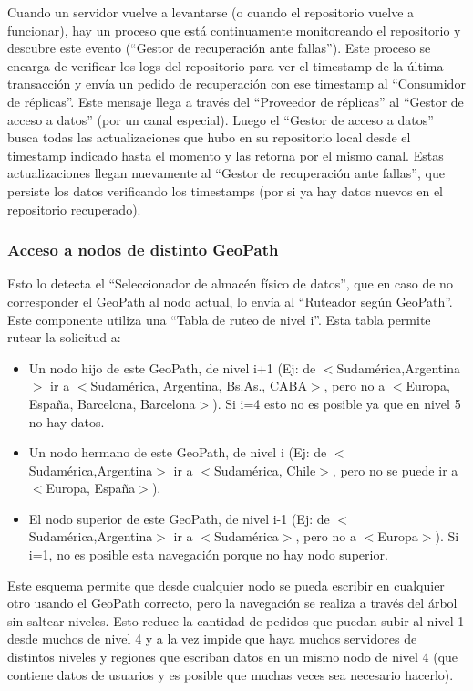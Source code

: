 Cuando un servidor vuelve a levantarse (o cuando el repositorio vuelve a funcionar), hay un proceso que está continuamente monitoreando el repositorio y descubre este evento (“Gestor de recuperación ante fallas”). Este proceso se encarga de verificar los logs del repositorio para ver el timestamp de la última transacción y envía un pedido de recuperación con ese timestamp al “Consumidor de réplicas”. Este mensaje llega a través del “Proveedor de réplicas” al “Gestor de acceso a datos” (por un canal especial). Luego el “Gestor de acceso a datos” busca todas las actualizaciones que hubo en su repositorio local desde el timestamp indicado hasta el momento y las retorna por el mismo canal. Estas actualizaciones llegan nuevamente al “Gestor de recuperación ante fallas”, que persiste los datos verificando los timestamps (por si ya hay datos nuevos en el repositorio recuperado). 


\subsubsection{Acceso a nodos de distinto GeoPath}

Esto lo detecta el “Seleccionador de almacén físico de datos”, que en caso de no corresponder el GeoPath al nodo actual, lo envía al “Ruteador según GeoPath”. Este componente utiliza una “Tabla de ruteo de nivel i”. Esta tabla permite rutear la solicitud a:

\begin{itemize}
	\item Un nodo hijo de este GeoPath, de nivel i+1 (Ej: de $<$Sudamérica,Argentina$>$ ir a $<$Sudamérica, Argentina, Bs.As., CABA$>$, pero no a $<$Europa, España, Barcelona, Barcelona$>$). Si i=4 esto no es posible ya que en nivel 5 no hay datos.
	\item Un nodo hermano de este GeoPath, de nivel i (Ej: de $<$Sudamérica,Argentina$>$ ir a $<$Sudamérica, Chile$>$, pero no se puede ir a $<$Europa, España$>$).
	\item El nodo superior de este GeoPath, de nivel i-1 (Ej: de $<$Sudamérica,Argentina$>$ ir a $<$Sudamérica$>$, pero no a $<$Europa$>$). Si i=1, no es posible esta navegación porque no hay nodo superior.
\end{itemize}

Este esquema permite que desde cualquier nodo se pueda escribir en cualquier otro usando el GeoPath correcto, pero la navegación se realiza a través del árbol sin saltear niveles. Esto reduce la cantidad de pedidos que puedan subir al nivel 1 desde muchos de nivel 4 y a la vez impide que haya muchos servidores de distintos niveles y regiones que escriban datos en un mismo nodo de nivel 4 (que contiene datos de usuarios y es posible que muchas veces sea necesario hacerlo).

